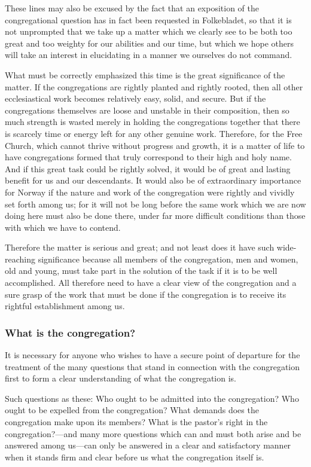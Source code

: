 These lines may also be excused by the fact that an exposition of the congregational question has in fact been requested in Folkebladet, so that it is not unprompted that we take up a matter which we clearly see to be both too great and too weighty for our abilities and our time, but which we hope others will take an interest in elucidating in a manner we ourselves do not command.

What must be correctly emphasized this time is the great significance of the matter. If the congregations are rightly planted and rightly rooted, then all other ecclesiastical work becomes relatively easy, solid, and secure. But if the congregations themselves are loose and unstable in their composition, then so much strength is wasted merely in holding the congregations together that there is scarcely time or energy left for any other genuine work. Therefore, for the Free Church, which cannot thrive without progress and growth, it is a matter of life to have congregations formed that truly correspond to their high and holy name. And if this great task could be rightly solved, it would be of great and lasting benefit for us and our descendants. It would also be of extraordinary importance for Norway if the nature and work of the congregation were rightly and vividly set forth among us; for it will not be long before the same work which we are now doing here must also be done there, under far more difficult conditions than those with which we have to contend.

Therefore the matter is serious and great; and not least does it have such wide-reaching significance because all members of the congregation, men and women, old and young, must take part in the solution of the task if it is to be well accomplished. All therefore need to have a clear view of the congregation and a sure grasp of the work that must be done if the congregation is to receive its rightful establishment among us.

\subsubsection{What is the congregation?}

It is necessary for anyone who wishes to have a secure point of departure for the treatment of the many questions that stand in connection with the congregation first to form a clear understanding of what the congregation is.

Such questions as these: Who ought to be admitted into the congregation? Who ought to be expelled from the congregation? What demands does the congregation make upon its members? What is the pastor’s right in the congregation?—and many more questions which can and must both arise and be answered among us—can only be answered in a clear and satisfactory manner when it stands firm and clear before us what the congregation itself is.


